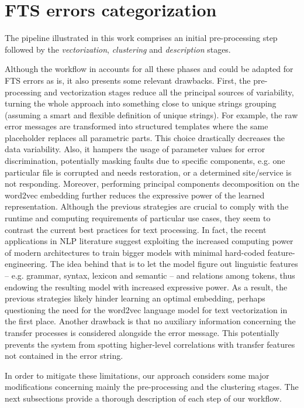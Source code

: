 \section{FTS errors categorization} \label{sec:pipeline}

The pipeline illustrated in this work comprises an initial pre-processing step followed by the \textit{vectorization}, \textit{clustering} and \textit{description} stages.

Although the workflow in
 accounts for all these phases and could be adapted for FTS errors as is, it also presents some relevant drawbacks.
First, the pre-processing and vectorization stages reduce all the principal sources of variability, turning the whole approach into something close to unique strings grouping (assuming a smart and flexible definition of unique strings). 
For example,  the raw error messages are transformed into structured templates where the same placeholder replaces all parametric parts.
This choice drastically decreases the data variability. Also, it hampers the usage of parameter values for error discrimination, potentially masking faults due to specific components, e.g. one particular file is corrupted and needs restoration, or a determined site/service is not responding.
Moreover, performing principal components decomposition on the word2vec embedding further reduces the expressive power of the learned representation.
Although the previous strategies are crucial to comply with the runtime and computing requirements of particular use cases, they seem to contrast the current best practices for text processing. 
In fact,  the recent applications in NLP literature suggest exploiting the increased computing power of modern architectures to train bigger models with minimal hard-coded feature-engineering. 
The idea behind that is to let the model figure out linguistic features -- e.g. grammar, syntax, lexicon and semantic -- and relations among tokens, thus endowing the resulting model with increased expressive power.
As a result, the previous strategies likely hinder learning an optimal embedding, perhaps questioning the need for the word2vec language model for text vectorization in the first place.
Another drawback is that no auxiliary information concerning the transfer processes is considered alongside the error message. This potentially prevents the system from spotting higher-level correlations with transfer features not contained in the error string.

In order to mitigate these limitations, our approach considers some major modifications concerning mainly the pre-processing and the clustering stages.
The next subsections provide a thorough description of each step of our workflow.%





